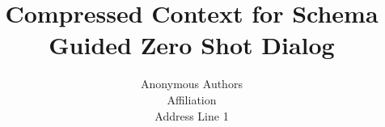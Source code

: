\documentclass[letterpaper]{article}
\title{Compressed Context for Schema Guided Zero Shot Dialog}
\author{Anonymous Authors\\
    Affiliation\\
    Address Line 1\\
}
\begin{document}
\maketitle
\begin{abstract}
    \begin{quote}
        
    \end{quote}
\end{abstract}









\end{document}
